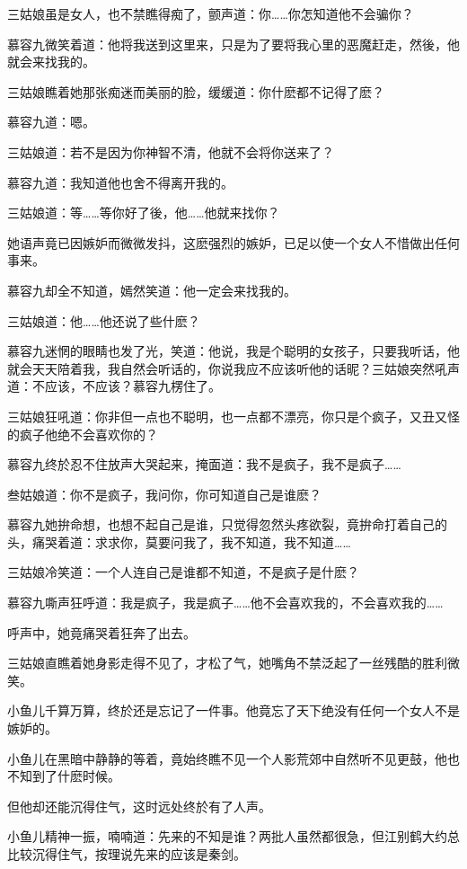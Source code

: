 \documentclass[12pt,oneside]{book}
\begin{document}
三姑娘虽是女人，也不禁瞧得痴了，颤声道：你\ldots\ldots 你怎知道他不会骗你？

慕容九微笑着道：他将我送到这里来，只是为了要将我心里的恶魔赶走，然後，他就会来找我的。

三姑娘瞧着她那张痴迷而美丽的脸，缓缓道：你什麽都不记得了麽？

慕容九道：嗯。

三姑娘道：若不是因为你神智不清，他就不会将你送来了？

慕容九道：我知道他也舍不得离开我的。

三姑娘道：等\ldots\ldots 等你好了後，他\ldots\ldots 他就来找你？

她语声竟已因嫉妒而微微发抖，这麽强烈的嫉妒，已足以使一个女人不惜做出任何事来。

慕容九却全不知道，嫣然笑道：他一定会来找我的。

三姑娘道：他\ldots\ldots 他还说了些什麽？

慕容九迷惘的眼睛也发了光，笑道：他说，我是个聪明的女孩子，只要我听话，他就会天天陪着我，我自然会听话的，你说我应不应该听他的话昵？三姑娘突然吼声道：不应该，不应该？慕容九楞住了。

三姑娘狂吼道：你非但一点也不聪明，也一点都不漂亮，你只是个疯子，又丑又怪的疯子他绝不会喜欢你的？

慕容九终於忍不住放声大哭起来，掩面道：我不是疯子，我不是疯子\ldots\ldots{}

叁姑娘道：你不是疯子，我问你，你可知道自己是谁麽？

慕容九她拚命想，也想不起自己是谁，只觉得忽然头疼欲裂，竟拚命打着自己的头，痛哭着道：求求你，莫要问我了，我不知道，我不知道\ldots\ldots{}

三姑娘冷笑道：一个人连自己是谁都不知道，不是疯子是什麽？

慕容九嘶声狂呼道：我是疯子，我是疯子\ldots\ldots 他不会喜欢我的，不会喜欢我的\ldots\ldots{}

呼声中，她竟痛哭着狂奔了出去。

三姑娘直瞧着她身影走得不见了，才松了气，她嘴角不禁泛起了一丝残酷的胜利微笑。

小鱼儿千算万算，终於还是忘记了一件事。他竟忘了天下绝没有任何一个女人不是嫉妒的。

小鱼儿在黑暗中静静的等着，竟始终瞧不见一个人影荒郊中自然听不见更鼓，他也不知到了什麽时候。

但他却还能沉得住气，这时远处终於有了人声。

小鱼儿精神一振，喃喃道：先来的不知是谁？两批人虽然都很急，但江别鹤大约总比较沉得住气，按理说先来的应该是秦剑。
\end{document}
